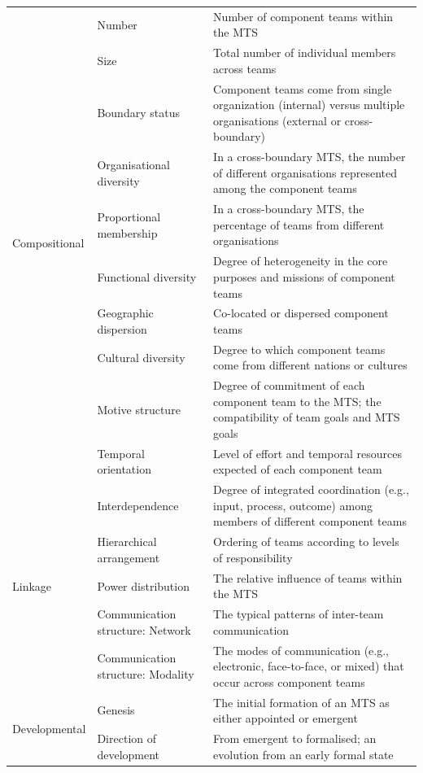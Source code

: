 \begin{center}
\begin{longtable}{ | p{2.25cm} | p{2.75cm} | p{6.10cm} | }
	\multirow{10}{*}{Compositional} & Number & Number of component teams within the MTS \\ \cline{2-3}
 	& Size & Total number of individual members across teams \\ \cline{2-3}
 	& Boundary status & Component teams come from single organization (internal) versus multiple organisations (external or cross-boundary) \\ \cline{2-3}
 	& Organisational diversity & In a cross-boundary MTS, the number of different organisations represented among the component teams \\ \cline{2-3}
	& Proportional membership & In a cross-boundary MTS, the percentage of teams from different organisations \\ \cline{2-3}
	& Functional diversity & Degree of heterogeneity in the core purposes and missions of component teams \\ \cline{2-3}
	& Geographic dispersion & Co-located or dispersed component teams \\ \cline{2-3}
	& Cultural diversity & Degree to which component teams come from different nations or cultures \\ \cline{2-3}
	& Motive structure & Degree of commitment of each component team to the MTS; the compatibility of team goals and MTS goals \\ \cline{2-3}
	& Temporal orientation & Level of effort and temporal resources expected of each component team \\ \cline{2-3}
\hline
	\multirow{5}{*}{Linkage} & Interdependence & Degree of integrated coordination (e.g., input, process, outcome) among members of different component teams \\ \cline{2-3}
 	& Hierarchical arrangement & Ordering of teams according to levels of responsibility \\ \cline{2-3}
 	& Power distribution & The relative influence of teams within the MTS \\ \cline{2-3}
	& Communication structure: Network & The typical patterns of inter-team communication \\ \cline{2-3}
	& Communication structure: Modality & The modes of communication (e.g., electronic, face-to-face, or mixed) that occur across component teams \\ \cline{2-3}
\hline
	\multirow{6}{*}{Developmental} & Genesis & The initial formation of an MTS as either appointed or emergent \\ \cline{2-3}
 	& Direction of development & From emergent to formalised; an evolution from an early formal state \\ \cline{2-3}

\end{longtable}
\end{center}
